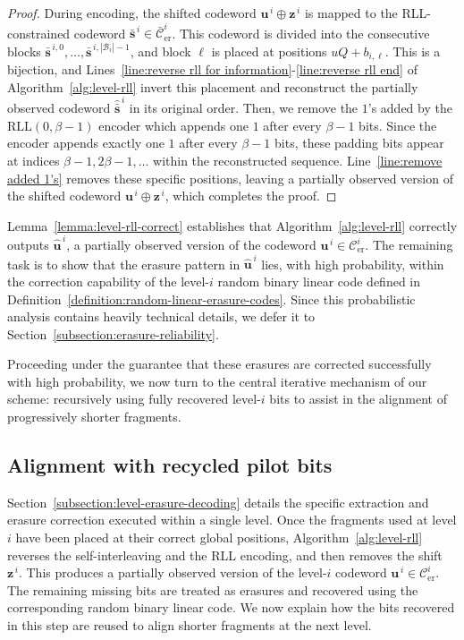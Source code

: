 \documentclass[journal,letterpaper,onecolumn,11pt]{IEEEtran}
\newcommand{\cB}{\mathcal{B}}
\newcommand{\cC}{\mathcal{C}}
\newcommand{\bolds}{\mathbf{s}}
\newcommand{\boldu}{\mathbf{u}}
\newcommand{\boldz}{\mathbf{z}}
\begin{document}
\begin{proof}
During encoding, the shifted codeword $\boldu^{\,i}\oplus\boldz^{\,i}$ is mapped to the RLL-constrained codeword \(\bar{\bolds}^{\,i}\in\bar{\cC}_{\mathrm{er}}^i\).
This codeword is divided into the consecutive blocks $\bar{\bolds}^{\,i,0},\ldots,\bar{\bolds}^{\,i,|\cB_i|-1}$, and block $\ell$ is placed at positions $uQ+b_{i,\ell}$. 
This is a bijection, and Lines~\ref{line:reverse rll for information}-\ref{line:reverse rll end} of Algorithm~\ref{alg:level-rll} invert this placement and reconstruct the partially observed codeword $\widehat{\bar{\bolds}}^{\,i}$ in its original order.
Then, we remove the  $1$'s added by the $\mathrm{RLL}(0,\beta-1)$ encoder
which appends one $1$ after every $\beta-1$ bits.
Since the encoder appends exactly one \(1\) after every \(\beta-1\) bits, these padding bits appear at indices \(\beta-1, 2\beta-1, \ldots\) within the reconstructed sequence.
Line~\ref{line:remove added 1's} removes these specific positions, leaving a partially observed version of the shifted codeword \(\boldu^{\,i}\oplus\boldz^{\,i}\), which completes the proof.
\end{proof}
Lemma~\ref{lemma:level-rll-correct} establishes that
Algorithm~\ref{alg:level-rll} correctly outputs
\(\widehat{\boldu}^{\,i}\), a partially observed version of the codeword
\(\boldu^{\,i}\in\cC_{\mathrm{er}}^i\).
The remaining task is to show that the erasure pattern in \(\widehat{\boldu}^{\,i}\) lies,
with high probability, within the correction capability of the level-\(i\)
random binary linear code defined in
Definition~\ref{definition:random-linear-erasure-codes}. 
Since this probabilistic analysis contains heavily technical details, we defer
it to Section~\ref{subsection:erasure-reliability}.

Proceeding under the guarantee that these erasures are corrected successfully with high probability, we now turn to the central iterative mechanism of our scheme: recursively using fully recovered level-\(i\) bits to assist in the alignment of progressively shorter fragments.

\subsection{Alignment with recycled pilot bits}\label{subsection:recycled-pilot-decoding}
Section~\ref{subsection:level-erasure-decoding} details the specific extraction and erasure correction executed within a single level. 
Once the fragments used at level \(i\) have been placed at their
correct global positions, Algorithm~\ref{alg:level-rll} reverses the
self-interleaving and the RLL encoding, and then removes the  shift
\(\boldz^{\,i}\). 
This produces a partially observed version of the
level-\(i\) codeword \(\boldu^{\,i}\in\cC_{\mathrm{er}}^i\). 
The remaining missing bits are treated as erasures and recovered using the corresponding random binary linear code.
We now explain how the bits recovered in this
step are reused to align shorter fragments at the next level.
\end{document}
